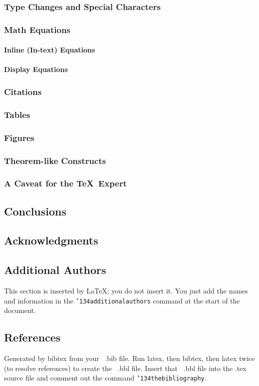 \documentclass{acm_proc_article-sp}
\begin{document}
\subsubsection{Type Changes and  Special Characters}
\subsubsection{Math Equations}
\paragraph{Inline (In-text) Equations}
\paragraph{Display Equations}
\subsubsection{Citations}
\subsubsection{Tables}
\subsubsection{Figures}
\subsubsection{Theorem-like Constructs}
\subsubsection*{A Caveat for the \TeX\ Expert}
\subsection{Conclusions}
\subsection{Acknowledgments}
\subsection{Additional Authors}
This section is inserted by \LaTeX; you do not insert it.
You just add the names and information in the
\texttt{{\char'134}additionalauthors} command at the start
of the document.
\subsection{References}
Generated by bibtex from your ~.bib file.  Run latex,
then bibtex, then latex twice (to resolve references)
to create the ~.bbl file.  Insert that ~.bbl file into
the .tex source file and comment out
the command \texttt{{\char'134}thebibliography}.
\end{document}
